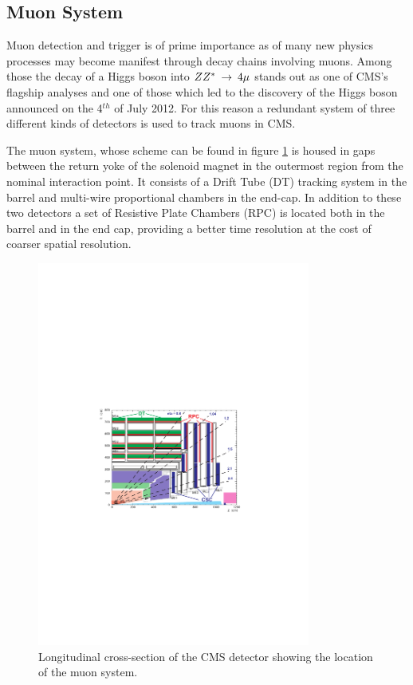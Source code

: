 \subsection{Muon System}

Muon detection and trigger is of prime importance as of many new physics processes may become manifest through decay chains involving muons. Among those the decay of a Higgs boson into $ZZ^*\:\rightarrow\:4\mu$ stands out as one of CMS's flagship analyses and one of those which led to the discovery of the Higgs boson announced on the 4$^{th}$ of July 2012. For this reason a redundant system of three different kinds of detectors is used to track muons in CMS. 

The muon system, whose scheme can be found in figure \ref{fig:mudet} is housed in gaps between the return yoke of the solenoid magnet in the outermost region from the nominal interaction point. It consists of a Drift Tube (DT) tracking system in the barrel and multi-wire proportional chambers in the end-cap. In addition to these two detectors a set of Resistive Plate Chambers (RPC) is located both in the barrel and in the end cap, providing a better time resolution  at the cost of coarser spatial resolution. 

\begin{figure}
\begin{center}
\includegraphics[angle=-0,width=0.8\textwidth]{2_LHC_and_CMS/pics/mudet.pdf}
\caption{Longitudinal cross-section of the CMS detector showing the location of the muon system.
\label{fig:mudet}
}
\end{center}
\end{figure}


